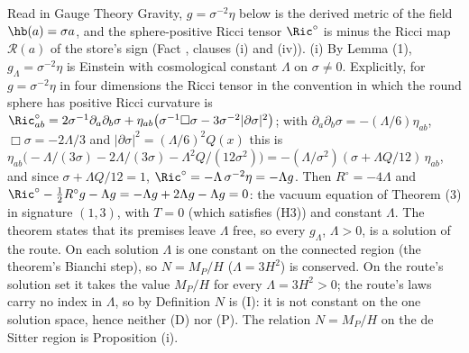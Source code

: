 Read in Gauge Theory Gravity, $g = \sigma^{-2}\eta$ below is the derived metric of the field $\hb(a) = \sigma a$, and the sphere-positive Ricci tensor $\Ric^{\circ}$ is minus the Ricci map $\mathcal{R}(a)$ of the store's sign (Fact , clauses (i) and (iv)). (i) By Lemma (1), $g_{\Lambda} = \sigma^{-2}\eta$ is Einstein with cosmological constant $\Lambda$ on $\sigma \neq 0$. Explicitly, for $g = \sigma^{-2}\eta$ in four dimensions the Ricci tensor in the convention in which the round sphere has positive Ricci curvature is $\Ric^{\circ}_{ab} = 2\sigma^{-1}\partial_{a}\partial_{b}\sigma + \eta_{ab}\bigl(\sigma^{-1}\Box\sigma - 3\sigma^{-2}|\partial\sigma|^{2}\bigr)$; with $\partial_{a}\partial_{b}\sigma = -(\Lambda/6)\eta_{ab}$, $\Box\sigma = -2\Lambda/3$ and $|\partial\sigma|^{2} = (\Lambda/6)^{2}Q(x)$ this is $\eta_{ab}\bigl(-\Lambda/(3\sigma) - 2\Lambda/(3\sigma) - \Lambda^{2}Q/(12\sigma^{2})\bigr) = -(\Lambda/\sigma^{2})(\sigma + \Lambda Q/12)\,\eta_{ab}$, and since $\sigma + \Lambda Q/12 = 1$, $\Ric^{\circ} = -\Lambda\,\sigma^{-2}\eta = -\Lambda g$. Then $R^{\circ} = -4\Lambda$ and $\Ric^{\circ} - \tfrac12R^{\circ}g - \Lambda g = -\Lambda g + 2\Lambda g - \Lambda g = 0$: the vacuum equation of Theorem (3) in signature $(1,3)$, with $T = 0$ (which satisfies (H3)) and constant $\Lambda$. The theorem states that its premises leave $\Lambda$ free, so every $g_{\Lambda}$, $\Lambda > 0$, is a solution of the route. On each solution $\Lambda$ is one constant on the connected region (the theorem's Bianchi step), so $N = M_{P}/H$ ($\Lambda = 3H^{2}$) is conserved. On the route's solution set it takes the value $M_{P}/H$ for every $\Lambda = 3H^{2} > 0$; the route's laws carry no index in $\Lambda$, so by Definition  $N$ is (I): it is not constant on the one solution space, hence neither (D) nor (P). The relation $N = M_{P}/H$ on the de Sitter region is Proposition (i).

